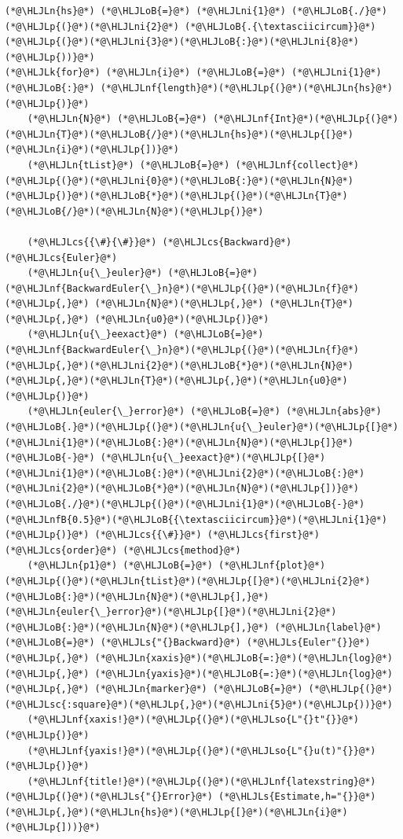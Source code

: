 \documentclass[12pt,a4paper]{article}
\newcommand{\HLJLk}[1]{\textcolor[RGB]{148,91,176}{\textbf{#1}}}
\newcommand{\HLJLn}[1]{#1}
\newcommand{\HLJLnf}[1]{\textcolor[RGB]{66,102,213}{#1}}
\newcommand{\HLJLs}[1]{\textcolor[RGB]{201,61,57}{#1}}
\newcommand{\HLJLsc}[1]{\textcolor[RGB]{201,61,57}{#1}}
\newcommand{\HLJLso}[1]{\textcolor[RGB]{201,61,57}{#1}}
\newcommand{\HLJLnfB}[1]{\textcolor[RGB]{59,151,46}{#1}}
\newcommand{\HLJLni}[1]{\textcolor[RGB]{59,151,46}{#1}}
\newcommand{\HLJLoB}[1]{\textcolor[RGB]{102,102,102}{\textbf{#1}}}
\newcommand{\HLJLp}[1]{#1}
\newcommand{\HLJLcs}[1]{\textcolor[RGB]{153,153,119}{\textit{#1}}}
\begin{document}
\begin{lstlisting}
(*@\HLJLn{hs}@*) (*@\HLJLoB{=}@*) (*@\HLJLni{1}@*) (*@\HLJLoB{./}@*)(*@\HLJLp{(}@*)(*@\HLJLni{2}@*) (*@\HLJLoB{.{\textasciicircum}}@*)(*@\HLJLp{(}@*)(*@\HLJLni{3}@*)(*@\HLJLoB{:}@*)(*@\HLJLni{8}@*)(*@\HLJLp{))}@*)
(*@\HLJLk{for}@*) (*@\HLJLn{i}@*) (*@\HLJLoB{=}@*) (*@\HLJLni{1}@*) (*@\HLJLoB{:}@*) (*@\HLJLnf{length}@*)(*@\HLJLp{(}@*)(*@\HLJLn{hs}@*)(*@\HLJLp{)}@*)
    (*@\HLJLn{N}@*) (*@\HLJLoB{=}@*) (*@\HLJLnf{Int}@*)(*@\HLJLp{(}@*)(*@\HLJLn{T}@*)(*@\HLJLoB{/}@*)(*@\HLJLn{hs}@*)(*@\HLJLp{[}@*)(*@\HLJLn{i}@*)(*@\HLJLp{])}@*)
    (*@\HLJLn{tList}@*) (*@\HLJLoB{=}@*) (*@\HLJLnf{collect}@*)(*@\HLJLp{(}@*)(*@\HLJLni{0}@*)(*@\HLJLoB{:}@*)(*@\HLJLn{N}@*)(*@\HLJLp{)}@*)(*@\HLJLoB{*}@*)(*@\HLJLp{(}@*)(*@\HLJLn{T}@*)(*@\HLJLoB{/}@*)(*@\HLJLn{N}@*)(*@\HLJLp{)}@*)

    (*@\HLJLcs{{\#}{\#}}@*) (*@\HLJLcs{Backward}@*) (*@\HLJLcs{Euler}@*)
    (*@\HLJLn{u{\_}euler}@*) (*@\HLJLoB{=}@*) (*@\HLJLnf{BackwardEuler{\_}n}@*)(*@\HLJLp{(}@*)(*@\HLJLn{f}@*)(*@\HLJLp{,}@*) (*@\HLJLn{N}@*)(*@\HLJLp{,}@*) (*@\HLJLn{T}@*)(*@\HLJLp{,}@*) (*@\HLJLn{u0}@*)(*@\HLJLp{)}@*)
    (*@\HLJLn{u{\_}eexact}@*) (*@\HLJLoB{=}@*) (*@\HLJLnf{BackwardEuler{\_}n}@*)(*@\HLJLp{(}@*)(*@\HLJLn{f}@*)(*@\HLJLp{,}@*)(*@\HLJLni{2}@*)(*@\HLJLoB{*}@*)(*@\HLJLn{N}@*)(*@\HLJLp{,}@*)(*@\HLJLn{T}@*)(*@\HLJLp{,}@*)(*@\HLJLn{u0}@*)(*@\HLJLp{)}@*)
    (*@\HLJLn{euler{\_}error}@*) (*@\HLJLoB{=}@*) (*@\HLJLn{abs}@*)(*@\HLJLoB{.}@*)(*@\HLJLp{(}@*)(*@\HLJLn{u{\_}euler}@*)(*@\HLJLp{[}@*)(*@\HLJLni{1}@*)(*@\HLJLoB{:}@*)(*@\HLJLn{N}@*)(*@\HLJLp{]}@*) (*@\HLJLoB{-}@*) (*@\HLJLn{u{\_}eexact}@*)(*@\HLJLp{[}@*)(*@\HLJLni{1}@*)(*@\HLJLoB{:}@*)(*@\HLJLni{2}@*)(*@\HLJLoB{:}@*)(*@\HLJLni{2}@*)(*@\HLJLoB{*}@*)(*@\HLJLn{N}@*)(*@\HLJLp{])}@*)(*@\HLJLoB{./}@*)(*@\HLJLp{(}@*)(*@\HLJLni{1}@*)(*@\HLJLoB{-}@*)(*@\HLJLnfB{0.5}@*)(*@\HLJLoB{{\textasciicircum}}@*)(*@\HLJLni{1}@*)(*@\HLJLp{)}@*) (*@\HLJLcs{{\#}}@*) (*@\HLJLcs{first}@*) (*@\HLJLcs{order}@*) (*@\HLJLcs{method}@*)
    (*@\HLJLn{p1}@*) (*@\HLJLoB{=}@*) (*@\HLJLnf{plot}@*)(*@\HLJLp{(}@*)(*@\HLJLn{tList}@*)(*@\HLJLp{[}@*)(*@\HLJLni{2}@*)(*@\HLJLoB{:}@*)(*@\HLJLn{N}@*)(*@\HLJLp{],}@*) (*@\HLJLn{euler{\_}error}@*)(*@\HLJLp{[}@*)(*@\HLJLni{2}@*)(*@\HLJLoB{:}@*)(*@\HLJLn{N}@*)(*@\HLJLp{],}@*) (*@\HLJLn{label}@*) (*@\HLJLoB{=}@*) (*@\HLJLs{"{}Backward}@*) (*@\HLJLs{Euler"{}}@*)(*@\HLJLp{,}@*) (*@\HLJLn{xaxis}@*)(*@\HLJLoB{=:}@*)(*@\HLJLn{log}@*)(*@\HLJLp{,}@*) (*@\HLJLn{yaxis}@*)(*@\HLJLoB{=:}@*)(*@\HLJLn{log}@*)(*@\HLJLp{,}@*) (*@\HLJLn{marker}@*) (*@\HLJLoB{=}@*) (*@\HLJLp{(}@*)(*@\HLJLsc{:square}@*)(*@\HLJLp{,}@*)(*@\HLJLni{5}@*)(*@\HLJLp{))}@*)
    (*@\HLJLnf{xaxis!}@*)(*@\HLJLp{(}@*)(*@\HLJLso{L"{}t"{}}@*)(*@\HLJLp{)}@*)
    (*@\HLJLnf{yaxis!}@*)(*@\HLJLp{(}@*)(*@\HLJLso{L"{}u(t)"{}}@*)(*@\HLJLp{)}@*)
    (*@\HLJLnf{title!}@*)(*@\HLJLp{(}@*)(*@\HLJLnf{latexstring}@*)(*@\HLJLp{(}@*)(*@\HLJLs{"{}Error}@*) (*@\HLJLs{Estimate,h="{}}@*)(*@\HLJLp{,}@*)(*@\HLJLn{hs}@*)(*@\HLJLp{[}@*)(*@\HLJLn{i}@*)(*@\HLJLp{]))}@*)


\end{lstlisting}
\end{document}
